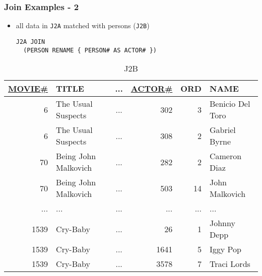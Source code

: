 \documentclass[dvipsnames]{beamer}
\theoremstyle{plain}
\begin{document}
\begin{frame}[fragile]
  \frametitle{Join Examples - 2}

  \begin{itemize}
    \item all data in \texttt{J2A} matched with persons (\texttt{J2B})
    \begin{lstlisting}
J2A JOIN
  (PERSON RENAME { PERSON# AS ACTOR# })
    \end{lstlisting}
  \end{itemize}

  \vspace{-10pt}
  \begin{tiny}
  \begin{table}
    \caption{J2B}
    \begin{tabular}{|r|l|c|r|r|l|}\hline
\underline{MOVIE\#} & TITLE & ... & \underline{ACTOR\#} & ORD & NAME\\[2pt]\hline\hline
   6 & The Usual Suspects   & ... &     302 &   3 & Benicio Del Toro\\\hline
   6 & The Usual Suspects   & ... &     308 &   2 & Gabriel Byrne   \\\hline
  70 & Being John Malkovich & ... &     282 &   2 & Cameron Diaz    \\\hline
  70 & Being John Malkovich & ... &     503 &  14 & John Malkovich  \\\hline
 ... & ...                  & ... &     ... & ... & ...             \\\hline
1539 & Cry-Baby             & ... &      26 &   1 & Johnny Depp     \\\hline
1539 & Cry-Baby             & ... &    1641 &   5 & Iggy Pop        \\\hline
1539 & Cry-Baby             & ... &    3578 &   7 & Traci Lords     \\\hline
    \end{tabular}
  \end{table}
  \end{tiny}
\end{frame}
\end{document}
